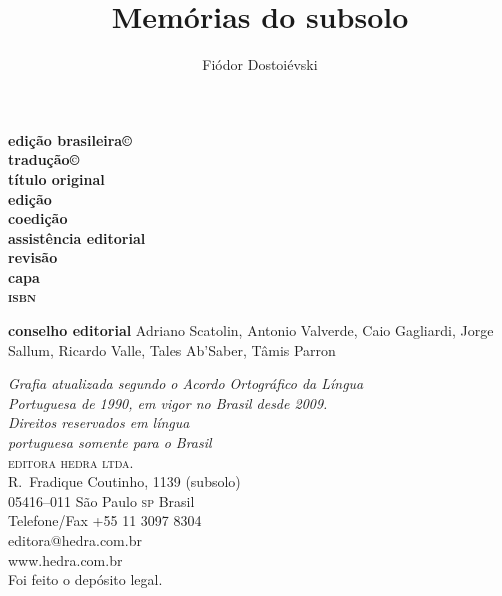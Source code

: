 \title{Memórias do subsolo}

\author{Fiódor Dostoiévski}

\chapter{}

\textbf{edição brasileira©}\\
\textbf{tradução©}\\

\textbf{título original}\\

\textbf{edição}\\
\textbf{coedição}\\
\textbf{assistência editorial}\\
\textbf{revisão}\\
\textbf{capa}\\

\textbf{\textsc{isbn}}

\textbf{conselho editorial} Adriano Scatolin, Antonio Valverde, Caio Gagliardi, Jorge Sallum, Ricardo Valle, Tales Ab'Saber, Tâmis Parron
 
\bigskip
\textit{Grafia atualizada segundo o Acordo Ortográfico da Língua\\
Portuguesa de 1990, em vigor no Brasil desde 2009.}\\

\vfill
\textit{Direitos reservados em língua\\ 
portuguesa somente para o Brasil}\\

\textsc{editora hedra ltda.}\\
R.~Fradique Coutinho, 1139 (subsolo)\\
05416--011 São Paulo \textsc{sp} Brasil\\
Telefone/Fax +55 11 3097 8304\\\smallskip
editora@hedra.com.br\\
www.hedra.com.br\\

Foi feito o depósito legal.

\chapter{}

